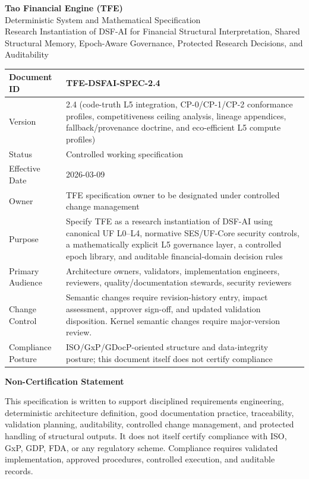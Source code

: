\documentclass[11pt]{report}
\begin{document}
\begin{titlepage}
\centering
{\Huge \textbf{Tao Financial Engine (TFE)}}\\[0.35cm]
{\LARGE Deterministic System and Mathematical Specification}\\[0.25cm]
{\Large Research Instantiation of DSF-AI for Financial Structural Interpretation, Shared Structural Memory, Epoch-Aware Governance, Protected Research Decisions, and Auditability}\\[0.9cm]

\renewcommand{\arraystretch}{1.18}
\begin{tabularx}{\textwidth}{|p{}|Y|}
\hline
Document ID & TFE-DSFAI-SPEC-2.4 \\\hline
Version & 2.4 (code-truth L5 integration, CP-0/CP-1/CP-2 conformance profiles, competitiveness ceiling analysis, lineage appendices, fallback/provenance doctrine, and eco-efficient L5 compute profiles) \\\hline
Status & Controlled working specification \\\hline
Effective Date & 2026-03-09 \\\hline
Owner & TFE specification owner to be designated under controlled change management \\\hline
Purpose & Specify TFE as a research instantiation of DSF-AI using canonical UF L0--L4, normative SES/UF-Core security controls, a mathematically explicit L5 governance layer, a controlled epoch library, and auditable financial-domain decision rules \\\hline
Primary Audience & Architecture owners, validators, implementation engineers, reviewers, quality/documentation stewards, security reviewers \\\hline
Change Control & Semantic changes require revision-history entry, impact assessment, approver sign-off, and updated validation disposition. Kernel semantic changes require major-version review. \\\hline
Compliance Posture & ISO/GxP/GDocP-oriented structure and data-integrity posture; this document itself does not certify compliance \\\hline
\end{tabularx}

\vfill
{\large \textbf{Non-Certification Statement}}\\[0.2cm]
\parbox{0.93\textwidth}{This specification is written to support disciplined requirements engineering, deterministic architecture definition, good documentation practice, traceability, validation planning, auditability, controlled change management, and protected handling of structural outputs. It does not itself certify compliance with ISO, GxP, GDP, FDA, or any regulatory scheme. Compliance requires validated implementation, approved procedures, controlled execution, and auditable records.}
\vfill
\end{titlepage}
\end{document}
